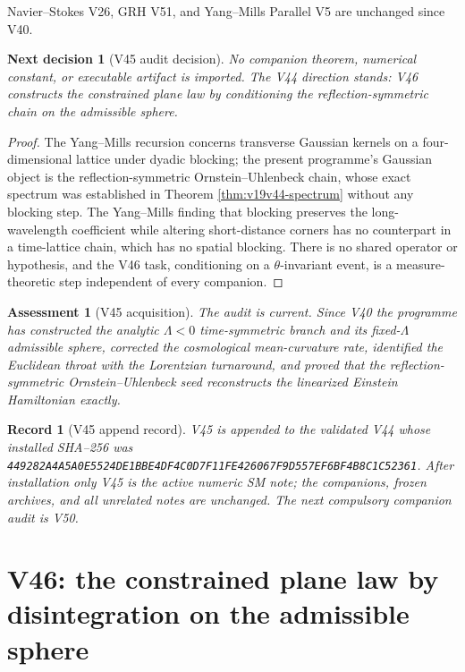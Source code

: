 \documentclass[11pt]{article}
\newtheorem{decision}[theorem]{Next decision}
\newtheorem{assessment}[theorem]{Assessment}
\newtheorem{record}[theorem]{Record}
\theoremstyle{remark}
\begin{document}
Navier--Stokes V26, GRH V51, and Yang--Mills Parallel V5 are unchanged
since V40.

\begin{decision}[V45 audit decision]
\label{dec:v19v45-audit}
No companion theorem, numerical constant, or executable artifact is
imported.  The V44 direction stands: V46 constructs the constrained
plane law by conditioning the reflection-symmetric chain on the
admissible sphere.
\end{decision}

\begin{proof}
The Yang--Mills recursion concerns transverse Gaussian kernels on a
four-dimensional lattice under dyadic blocking; the present programme's
Gaussian object is the reflection-symmetric Ornstein--Uhlenbeck chain,
whose exact spectrum was established in Theorem
\ref{thm:v19v44-spectrum} without any blocking step.  The Yang--Mills
finding that blocking preserves the long-wavelength coefficient while
altering short-distance corners has no counterpart in a time-lattice
chain, which has no spatial blocking.  There is no shared operator or
hypothesis, and the V46 task, conditioning on a \(\theta\)-invariant
event, is a measure-theoretic step independent of every companion.
\end{proof}

\begin{assessment}[V45 acquisition]
\label{ass:v19v45}
The audit is current.  Since V40 the programme has constructed the
analytic \(\Lambda<0\) time-symmetric branch and its fixed-\(\Lambda\)
admissible sphere, corrected the cosmological mean-curvature rate,
identified the Euclidean throat with the Lorentzian turnaround, and
proved that the reflection-symmetric Ornstein--Uhlenbeck seed
reconstructs the linearized Einstein Hamiltonian exactly.
\end{assessment}

\begin{record}[V45 append record]
\label{rec:v19v45}
V45 is appended to the validated V44 whose installed SHA--256 was
\texttt{449282A4A5A0E5524DE1BBE4DF4C0D7F11FE426067F9D557EF6BF4B8C1C52361}.
After installation only V45 is the active numeric SM note; the
companions, frozen archives, and all unrelated notes are unchanged.  The
next compulsory companion audit is V50.
\end{record}


\section{V46: the constrained plane law by disintegration on the admissible sphere}
\label{sec:v19v46}
\end{document}
